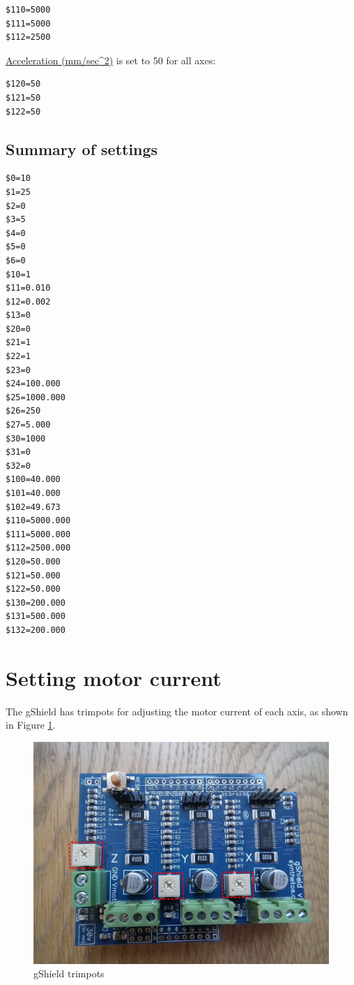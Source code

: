 \documentclass[]{book}
\theoremstyle{definition}
\theoremstyle{definition}
\theoremstyle{remark}
\begin{document}
\begin{verbatim}
$110=5000
$111=5000
$112=2500
\end{verbatim}

\href{https://github.com/gnea/grbl/wiki/Grbl-v1.1-Configuration\#120-121-122--xyz-acceleration-mmsec2}{Acceleration
(mm/sec\^{}2)} is set to 50 for all axes:

\begin{verbatim}
$120=50
$121=50
$122=50
\end{verbatim}

\subsection{Summary of settings}\label{summary-of-settings}

\begin{verbatim}
$0=10
$1=25
$2=0
$3=5
$4=0
$5=0
$6=0
$10=1
$11=0.010
$12=0.002
$13=0
$20=0
$21=1
$22=1
$23=0
$24=100.000
$25=1000.000
$26=250
$27=5.000
$30=1000
$31=0
$32=0
$100=40.000
$101=40.000
$102=49.673
$110=5000.000
$111=5000.000
$112=2500.000
$120=50.000
$121=50.000
$122=50.000
$130=200.000
$131=500.000
$132=200.000
\end{verbatim}

\section{Setting motor current}\label{setting-motor-current}

The gShield has trimpots for adjusting the motor current of each axis,
as shown in Figure \ref{fig:gShield}.

\begin{figure}

{\centering \includegraphics[width=0.75\linewidth]{images/gShield-trimpots} 

}

\caption{gShield trimpots}\label{fig:gShield}
\end{figure}
\end{document}
